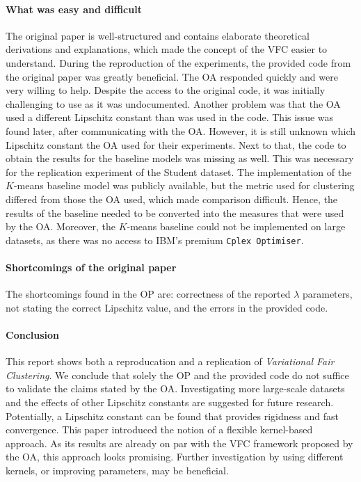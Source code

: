 \paragraph{What was easy and difficult}\label{sec:difficult}
The original paper is well-structured and contains elaborate theoretical derivations and explanations, which made the concept of the VFC easier to understand. During the reproduction of the experiments, the provided code from the original paper was greatly beneficial. The OA responded quickly and were very willing to help.
Despite the access to the original code, it was initially challenging to use as it was undocumented. Another problem was that the OA used a different Lipschitz constant than was used in the code. This issue was found later, after communicating with the OA. However, it is still unknown which Lipschitz constant the OA used for their experiments. Next to that, the code to obtain the results for the baseline models was missing as well. This was necessary for the replication experiment of the Student dataset. The implementation of the $K$-means baseline model was publicly available, but the metric used for clustering differed from those the OA used, which made comparison difficult. Hence, the results of the baseline needed to be converted into the measures that were used by the OA. Moreover, the $K$-means baseline could not be implemented on large datasets, as there was no access to IBM's premium \texttt{Cplex Optimiser}.

\paragraph{Shortcomings of the original paper}

The shortcomings found in the OP are: correctness of the reported $\lambda$ parameters, not stating the correct Lipschitz value, and the errors in the provided code.

\paragraph{Conclusion} This report shows both a reproducation and a replication of \textit{Variational Fair Clustering}. We conclude that solely the OP and the provided code do not suffice to validate the claims stated by the OA. Investigating more large-scale datasets and the effects of other Lipschitz constants are suggested for future research. Potentially, a Lipschitz constant can be found that provides rigidness and fast convergence. This paper introduced the notion of a flexible kernel-based approach. As its results are already on par with the VFC framework proposed by the OA, this approach looks promising. Further investigation by using different kernels, or improving parameters, may be beneficial.

